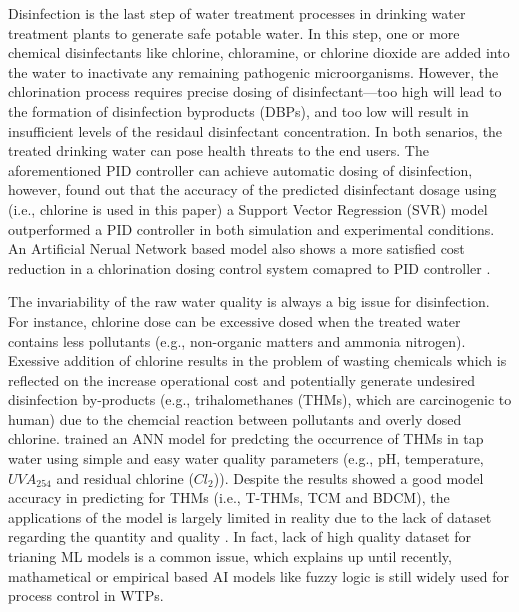 Disinfection is the last step of water treatment processes in drinking water treatment plants to generate safe potable water. In this step, one or more chemical disinfectants like chlorine, chloramine, or chlorine dioxide are added into the water to inactivate any remaining pathogenic microorganisms. However, the chlorination process requires precise dosing of disinfectant---too high will lead to the formation of disinfection byproducts (DBPs), and too low will result in insufficient levels of the residaul disinfectant concentration. In both senarios, the treated drinking water can pose health threats to the end users. The aforementioned PID controller can achieve automatic dosing of disinfection, however, \citet{wangModelPredictiveControl2020} found out that the accuracy of the predicted disinfectant dosage using (i.e., chlorine is used in this paper) a Support Vector Regression (SVR) model outperformed a PID controller in both simulation and experimental conditions. An Artificial Nerual Network based model also shows a more satisfied cost reduction in a chlorination dosing control system comapred to PID controller \citep{librantzArtificialNeuralNetworks2018}.

The invariability of the raw water quality is always a big issue for disinfection. For instance, chlorine dose can be excessive dosed when the treated water contains less pollutants (e.g., non-organic matters and ammonia nitrogen). Exessive addition of chlorine results in the problem of wasting chemicals which is reflected on the increase operational cost and potentially generate undesired disinfection by-products (e.g., trihalomethanes (THMs), which are carcinogenic to human) due to the chemcial reaction between pollutants and overly dosed chlorine. \citet{xuUsingSimpleEasy2022} trained an ANN model for predcting the occurrence of THMs in tap water using simple and easy water quality parameters (e.g., pH, temperature, $UVA_{254}$ and residual chlorine ($Cl_{2}$)). Despite the results showed a good model accuracy in predicting for THMs (i.e., T-THMs, TCM and BDCM), the applications of the model is largely limited in reality due to the lack of dataset regarding the quantity and quality . In fact, lack of high quality dataset for trianing ML models is a common issue, which explains up until recently, mathametical or empirical based AI models like fuzzy logic \citep{gamizFuzzyGainScheduling2020,godo-plaControlPrimaryDisinfection2021} is still widely used for process control in WTPs.

